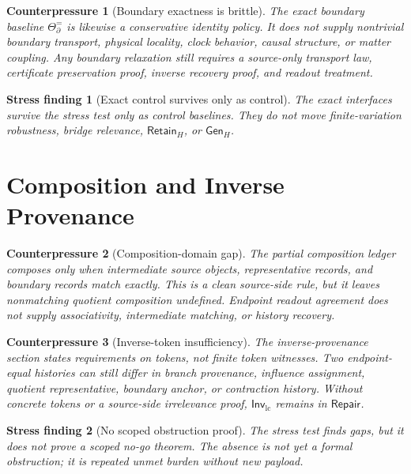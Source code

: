 \documentclass[11pt]{article}
\newcommand{\InvLC}{\mathsf{Inv}_{\mathrm{lc}}}
\newcommand{\RetainH}{\mathsf{Retain}_{H}}
\newcommand{\GenH}{\mathsf{Gen}_{H}}
\newcommand{\Repair}{\mathsf{Repair}}
\newtheorem{stressfinding}{Stress finding}
\newtheorem{counterpressure}{Counterpressure}
\begin{document}
\begin{counterpressure}[Boundary exactness is brittle]
The exact boundary baseline \(\Theta_{\partial}^{=}\) is likewise a
conservative identity policy. It does not supply nontrivial boundary
transport, physical locality, clock behavior, causal structure, or
matter coupling. Any boundary relaxation still requires a source-only
transport law, certificate preservation proof, inverse recovery proof,
and readout treatment.
\end{counterpressure}

\begin{stressfinding}[Exact control survives only as control]
The exact interfaces survive the stress test only as control
baselines. They do not move finite-variation robustness, bridge
relevance, \(\RetainH\), or \(\GenH\).
\end{stressfinding}

\section{Composition and Inverse Provenance}

\begin{counterpressure}[Composition-domain gap]
The partial composition ledger composes only when intermediate source
objects, representative records, and boundary records match exactly.
This is a clean source-side rule, but it leaves nonmatching quotient
composition undefined. Endpoint readout agreement does not supply
associativity, intermediate matching, or history recovery.
\end{counterpressure}

\begin{counterpressure}[Inverse-token insufficiency]
The inverse-provenance section states requirements on tokens, not
finite token witnesses. Two endpoint-equal histories can still differ
in branch provenance, influence assignment, quotient representative,
boundary anchor, or contraction history. Without concrete tokens or a
source-side irrelevance proof, \(\InvLC\) remains in \(\Repair\).
\end{counterpressure}

\begin{stressfinding}[No scoped obstruction proof]
The stress test finds gaps, but it does not prove a scoped no-go
theorem. The absence is not yet a formal obstruction; it is repeated
unmet burden without new payload.
\end{stressfinding}
\end{document}
